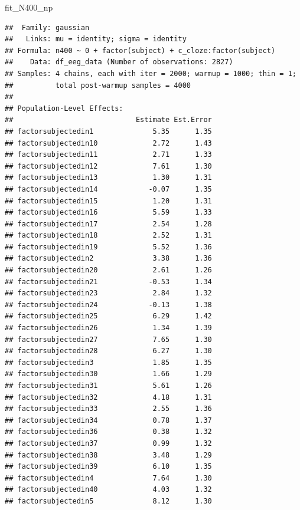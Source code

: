 \documentclass[12pt,ignorenonframetext,aspectratio=169]{beamer}
\newenvironment{Shaded}{\begin{snugshade}}{\end{snugshade}}
\newcommand{\NormalTok}[1]{#1}
\begin{document}
\begin{frame}[fragile]

\vspace{.1in}

\tiny

\begin{Shaded}
\begin{Highlighting}[]
\NormalTok{fit_N400_np}
\end{Highlighting}
\end{Shaded}

\begin{verbatim}
##  Family: gaussian 
##   Links: mu = identity; sigma = identity 
## Formula: n400 ~ 0 + factor(subject) + c_cloze:factor(subject) 
##    Data: df_eeg_data (Number of observations: 2827) 
## Samples: 4 chains, each with iter = 2000; warmup = 1000; thin = 1;
##          total post-warmup samples = 4000
## 
## Population-Level Effects: 
##                             Estimate Est.Error
## factorsubjectedin1              5.35      1.35
## factorsubjectedin10             2.72      1.43
## factorsubjectedin11             2.71      1.33
## factorsubjectedin12             7.61      1.30
## factorsubjectedin13             1.30      1.31
## factorsubjectedin14            -0.07      1.35
## factorsubjectedin15             1.20      1.31
## factorsubjectedin16             5.59      1.33
## factorsubjectedin17             2.54      1.28
## factorsubjectedin18             2.52      1.31
## factorsubjectedin19             5.52      1.36
## factorsubjectedin2              3.38      1.36
## factorsubjectedin20             2.61      1.26
## factorsubjectedin21            -0.53      1.34
## factorsubjectedin23             2.84      1.32
## factorsubjectedin24            -0.13      1.38
## factorsubjectedin25             6.29      1.42
## factorsubjectedin26             1.34      1.39
## factorsubjectedin27             7.65      1.30
## factorsubjectedin28             6.27      1.30
## factorsubjectedin3              1.85      1.35
## factorsubjectedin30             1.66      1.29
## factorsubjectedin31             5.61      1.26
## factorsubjectedin32             4.18      1.31
## factorsubjectedin33             2.55      1.36
## factorsubjectedin34             0.78      1.37
## factorsubjectedin36             0.38      1.32
## factorsubjectedin37             0.99      1.32
## factorsubjectedin38             3.48      1.29
## factorsubjectedin39             6.10      1.35
## factorsubjectedin4              7.64      1.30
## factorsubjectedin40             4.03      1.32
## factorsubjectedin5              8.12      1.30

\end{verbatim}
\end{frame}
\end{document}
